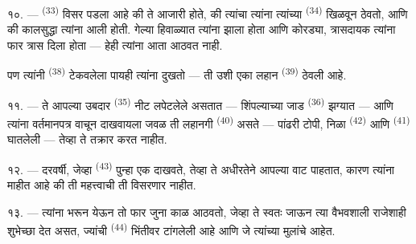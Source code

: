 \VUsaut{4.2mm}
\VUsaut{3.0mm}

१०. ---  \textsuperscript{(33)} विसर पडला आहे की ते आजारी
होते, की त्यांचा  त्यांना त्यांच्या 
\textsuperscript{(34)} खिळवून ठेवतो, आणि की कालसुद्धा त्यांना  आली होती. गेल्या हिवाळ्यात त्यांना  झाला होता आणि
कोरड्या, त्रासदायक  त्यांना फार त्रास दिला होता --- हेही त्यांना
आता आठवत नाही.

पण त्यांनी  \textsuperscript{(38)} टेकवलेला पायही त्यांना
दुखतो --- ती उशी एका लहान  \textsuperscript{(39)} ठेवली आहे.

११. --- ते आपल्या उबदार  \textsuperscript{(35)} नीट लपेटलेले
असतात --- शिंपल्याच्या जाड  \textsuperscript{(36)} झग्यात ---
आणि त्यांना वर्तमानपत्र वाचून दाखवायला जवळ ती लहानगी 
\textsuperscript{(40)} असते --- पांढरी टोपी, निळा 
\textsuperscript{(42)} आणि  \textsuperscript{(41)} घातलेली ---
तेव्हा ते तक्रार करत नाहीत.

१२. --- दरवर्षी, जेव्हा  \textsuperscript{(43)} पुन्हा एक
  दाखवते, तेव्हा ते अधीरतेने आपल्या
 वाट पाहतात, कारण त्यांना माहीत आहे की ती महत्त्वाची
 ती विसरणार नाहीत.

१३. --- त्यांना भरून येऊन तो फार जुना काळ आठवतो, जेव्हा ते स्वतः जाऊन त्या
वैभवशाली राजेशाही  शुभेच्छा देत असत, ज्यांची 
\textsuperscript{(44)} भिंतीवर टांगलेली आहे आणि जे त्यांच्या मुलांचे
 आहेत.

\VUsaut{6.0mm}
\VUfilet{22mm}
